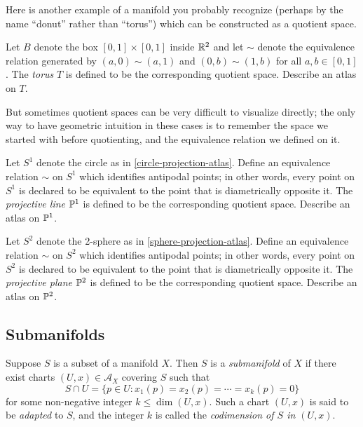 Here is another example of a manifold you probably recognize (perhaps by the name ``donut'' rather than ``torus'') which can be constructed as a quotient space.

\begin{exercise}[Torus] \label{torus} 
	Let $B$ denote the box $[0,1] \times [0,1]$ inside $\mathbb{R}^2$ and let $\sim$ denote the equivalence relation generated by $(a,0) \sim (a,1)$ and $(0,b) \sim (1,b)$ for all $a, b \in [0,1]$. The \emph{torus} $T$ is defined to be the corresponding quotient space. Describe an atlas on $T$. 
\end{exercise}


But sometimes quotient spaces can be very difficult to visualize directly; the only way to have geometric intuition in these cases is to remember the space we started with before quotienting, and the equivalence relation we defined on it. 

\begin{exercise} \label{rp1}  
	Let $S^1$ denote the circle as in \cref{circle-projection-atlas}. Define an equivalence relation $\sim$ on $S^1$ which identifies antipodal points; in other words, every point on $S^1$ is declared to be equivalent to the point that is diametrically opposite it. The \emph{projective line} $\mathbb{P}^1$ is defined to be the corresponding quotient space. Describe an atlas on $\mathbb{P}^1$. 
\end{exercise}

\begin{exercise} \label{rp2}  
	Let $S^2$ denote the 2-sphere as in \cref{sphere-projection-atlas}. Define an equivalence relation $\sim$ on $S^2$ which identifies antipodal points; in other words, every point on $S^2$ is declared to be equivalent to the point that is diametrically opposite it. The \emph{projective plane} $\mathbb{P}^2$ is defined to be the corresponding quotient space. Describe an atlas on $\mathbb{P}^2$. 
\end{exercise}

\subsection{Submanifolds}

\begin{definition} \label{submanifold}
	Suppose $S$ is a subset of a manifold $X$. Then $S$ is a \emph{submanifold} of $X$ if there exist charts $(U, x) \in \mathscr{A}_X$ covering $S$ such that 
	\[ S \cap U = \{ p \in U :  x_1(p) = x_2(p) = \dotsb = x_k(p) = 0 \} \]
	for some non-negative integer $k \leq \dim(U,x)$. Such a chart $(U,x)$ is said to be \emph{adapted} to $S$, and the integer $k$ is called the \emph{codimension of $S$ in $(U,x)$}. 
\end{definition}


